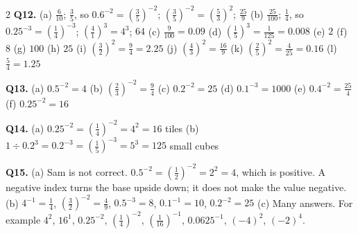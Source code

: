 \documentclass[12pt,a4paper]{article}
\begin{document}
{\begin{multicols}{2}
\textbf{Q12.} (a) $\frac{6}{10}$; \; $\frac35$, so
$0.6^{-2}=\left(\frac35\right)^{-2}$; \;
$\left(\frac35\right)^{-2}=\left(\frac53\right)^2$; \; $\frac{25}{9}$ \quad
(b) $\frac{25}{100}$; \; $\frac14$, so $0.25^{-3}=\left(\frac14\right)^{-3}$;
\; $\left(\frac41\right)^3=4^3$; \; $64$ \quad
(c) $\frac{9}{100}=0.09$ \quad (d) $\left(\frac15\right)^3=\frac1{125}=0.008$
\quad (e) $2$ \quad (f) $8$ \quad (g) $100$ \quad (h) $25$ \quad
(i) $\left(\frac32\right)^2=\frac94=2.25$ \quad
(j) $\left(\frac43\right)^2=\frac{16}{9}$ \quad
(k) $\left(\frac25\right)^2=\frac4{25}=0.16$ \quad (l) $\frac54=1.25$

\textbf{Q13.} (a) $0.5^{-2}=4$ \quad (b) $\left(\frac23\right)^{-2}=\frac94$
\quad (c) $0.2^{-2}=25$ \quad (d) $0.1^{-3}=1000$ \quad
(e) $0.4^{-2}=\frac{25}{4}$ \quad (f) $0.25^{-2}=16$

\textbf{Q14.} (a) $0.25^{-2}=\left(\frac14\right)^{-2}=4^2=16$ tiles \quad
(b) $1\div0.2^3=0.2^{-3}=\left(\frac15\right)^{-3}=5^3=125$ small cubes

\textbf{Q15.} (a) Sam is not correct.
$0.5^{-2}=\left(\frac12\right)^{-2}=2^2=4$, which is positive. A negative index
turns the base upside down; it does not make the value negative. \quad
(b) $4^{-1}=\frac14$, \; $\left(\frac32\right)^{-2}=\frac49$, \;
$0.5^{-3}=8$, \; $0.1^{-1}=10$, \; $0.2^{-2}=25$ \quad (c) Many answers. For
example $4^2$, $16^1$, $0.25^{-2}$, $\left(\frac14\right)^{-2}$,
$\left(\frac1{16}\right)^{-1}$, $0.0625^{-1}$, $(-4)^2$, $(-2)^4$.

\end{multicols}
}
\end{document}
